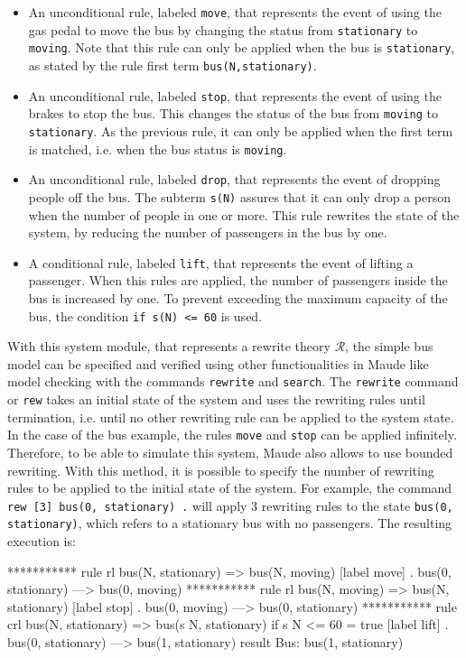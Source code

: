 \begin{itemize}
    \item An unconditional rule, labeled \texttt{move}, that represents the event of using the gas pedal to move the bus by changing the status from \texttt{stationary} to \texttt{moving}. Note that this rule can only be applied when the bus is \texttt{stationary}, as stated by the rule first term \texttt{bus(N,stationary)}.
    \item An unconditional rule, labeled \texttt{stop}, that represents the event of using the brakes to stop the bus. This changes the status of the bus from \texttt{moving} to \texttt{stationary}. As the previous rule, it can only be applied when the first term is matched, i.e. when the bus status is \texttt{moving}. 
    \item An unconditional rule, labeled \texttt{drop}, that represents the event of dropping people off the bus. The subterm \texttt{s(N)} assures that it can only drop a person when the number of people in one or more. This rule rewrites the state of the system, by reducing the number of passengers in the bus by one.
    \item A conditional rule, labeled \texttt{lift}, that represents the event of lifting a passenger. When this rules are applied, the number of passengers inside the bus is increased by one. To prevent exceeding the maximum capacity of the bus, the condition \texttt{if s(N) <= 60} is used. 
\end{itemize}
With this system module, that represents a rewrite theory $\mathscr{R}$, the simple bus model can be specified and verified using other functionalities in Maude like model checking with the commands \texttt{rewrite} and \texttt{search}. The \texttt{rewrite} command or \texttt{rew} takes an initial state of the system and uses the rewriting rules until termination, i.e. until no other rewriting rule can be applied to the system state. In the case of the bus example, the rules \texttt{move} and \texttt{stop} can be applied infinitely. Therefore, to be able to simulate this system, Maude also allows to use bounded rewriting. With this method, it is possible to specify the number of rewriting rules to be applied to the initial state of the system. For example, the command \texttt{rew [3] bus(0, stationary) .} will apply 3 rewriting rules to the state \texttt{bus(0, stationary)}, which refers to a stationary bus with no passengers. The resulting execution is:
\\
\begin{maude2}
*********** rule
rl bus(N, stationary) => bus(N, moving) [label move] .
bus(0, stationary)
--->
bus(0, moving)
*********** rule
rl bus(N, moving) => bus(N, stationary) [label stop] .
bus(0, moving)
--->
bus(0, stationary)
*********** rule
crl bus(N, stationary) => bus(s N, stationary) 
                          if s N <= 60 = true [label lift] .
bus(0, stationary)
--->
bus(1, stationary)
result Bus: bus(1, stationary)
\end{maude2}
